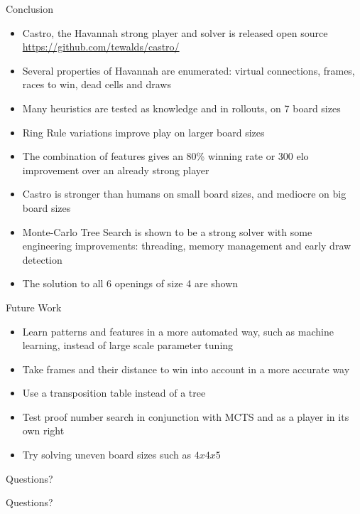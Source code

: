 \documentclass{beamer} %
\begin{document}
\begin{frame}{Conclusion}
\begin{itemize}
	\item Castro, the Havannah strong player and solver is released open source \url{https://github.com/tewalds/castro/}
	\item Several properties of Havannah are enumerated: virtual connections, frames, races to win, dead cells and draws
	\item Many heuristics are tested as knowledge and in rollouts, on 7  board sizes
	\item Ring Rule variations improve play on larger board sizes
	\item The combination of features gives an 80\% winning rate or 300 elo improvement over an already strong player
	\item Castro is stronger than humans on small board sizes, and mediocre on big board sizes
	\item Monte-Carlo Tree Search is shown to be a strong solver with some engineering improvements: threading, memory management and early draw detection
	\item The solution to all 6 openings of size 4 are shown
\end{itemize}
\end{frame}


\begin{frame}{Future Work}
\begin{itemize}
\item Learn patterns and features in a more automated way, such as machine learning, instead of large scale parameter tuning
\item Take frames and their distance to win into account in a more accurate way
\item Use a transposition table instead of a tree
\item Test proof number search in conjunction with MCTS and as a player in its own right
\item Try solving uneven board sizes such as $4x4x5$
\end{itemize}
\end{frame}


\begin{frame}{Questions?}
\begin{center}
\Huge
Questions?
\end{center}
\end{frame}
\end{document}
